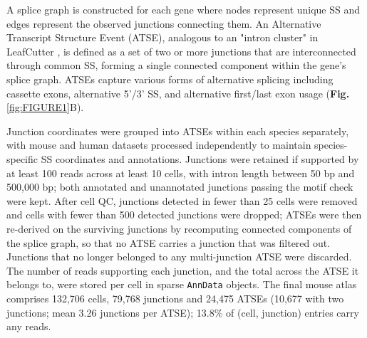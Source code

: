 A splice graph is constructed for each gene where nodes represent unique SS and edges represent the observed junctions connecting them. An Alternative Transcript Structure Event (ATSE), analogous to an "intron cluster" in LeafCutter \cite{Leafcutter}, is defined as a set of two or more junctions that are interconnected through common SS, forming a single connected component within the gene's splice graph. ATSEs capture various forms of alternative splicing including cassette exons, alternative 5'/3' SS, and alternative first/last exon usage (\textbf{Fig.} \ref{fig:FIGURE1}B).

Junction coordinates were grouped into ATSEs within each species separately, with mouse and human datasets processed independently to maintain species-specific SS coordinates and annotations. Junctions were retained if supported by at least 100 reads across at least 10 cells, with intron length between 50 bp and 500{,}000 bp; both annotated and unannotated junctions passing the motif check were kept. After cell QC, junctions detected in fewer than 25 cells were removed and cells with fewer than 500 detected junctions were dropped; ATSEs were then re-derived on the surviving junctions by recomputing connected components of the splice graph, so that no ATSE carries a junction that was filtered out. Junctions that no longer belonged to any multi-junction ATSE were discarded. The number of reads supporting each junction, and the total across the ATSE it belongs to, were stored per cell in sparse \texttt{AnnData}\cite{Anndata} objects. The final mouse atlas comprises 132{,}706 cells, 79{,}768 junctions and 24{,}475 ATSEs (10{,}677 with two junctions; mean 3.26 junctions per ATSE); 13.8\% of (cell, junction) entries carry any reads.

